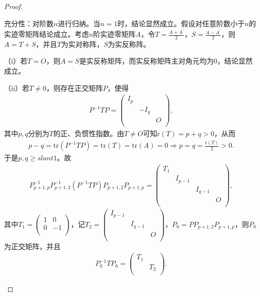 \documentclass[../../main.tex]{subfiles}
\begin{document}
\begin{proof}
\begin{enumerate}[(1)]
充分性：对阶数\(n\)进行归纳。当\(n = 1\)时，结论显然成立。假设对任意阶数小于\(n\)的实迹零矩阵结论成立。考虑\(n\)阶实迹零矩阵\(A\)，令\(T=\frac{A + A^\prime}{2}\)，\(S=\frac{A - A^\prime}{2}\)，则\(A = T + S\)，并且\(T\)为实对称阵，\(S\)为实反称阵。

（i）若\(T = O\)，则\(A = S\)是实反称矩阵，而实反称矩阵主对角元均为\(0\)，结论显然成立。

（ii）若\(T\ne 0\)，则存在正交矩阵\(P\)，使得
\begin{align*}
P^{-1}TP=\left( \begin{matrix}
I_p& & \\
& -I_q& \\
& & O\\
\end{matrix} \right),
\end{align*}
其中\(p,q\)分别为\(T\)的正、负惯性指数。由\(T\ne O\)可知\(\text{r}(T)=p + q>0\)，从而
\begin{align*}
p - q=\mathrm{tr}(P^{-1}TP)=\mathrm{tr}(T)=\mathrm{tr}(A)=0\Rightarrow p = q=\frac{\mathrm{r}(T)}{2}>0.
\end{align*}
于是\(p,q\geqslant slant 1\)。故
\begin{align*}
P_{p + 1,p}^{-1}P_{p + 1,2}^{-1}(P^{-1}TP)P_{p + 1,2}P_{p + 1,p}=\left( \begin{matrix}
T_1& & & \\
& I_{p - 1}& & \\
& & I_{q - 1}& \\
& & & O\\
\end{matrix} \right),
\end{align*}
其中\(T_1=\left( \begin{matrix}
1&0\\
0& -1\\
\end{matrix} \right)\)，记\(T_2=\left( \begin{matrix}
I_{p - 1}& & \\
& I_{q - 1}& \\
& & O\\
\end{matrix} \right)\)，\(P_0 = PP_{p + 1,2}P_{p + 1,p}\)，则\(P_0\)为正交矩阵，并且
\begin{align*}
P_{0}^{-1}TP_0=\left( \begin{matrix}
T_1& \\
& T_2\\
\end{matrix} \right).
\end{align*}

\end{enumerate}
\end{proof}
\end{document}
